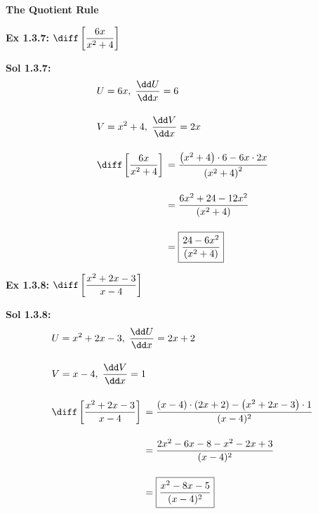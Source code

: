 \bigskip

\textbf{\large{The Quotient Rule}} \par

\begin{tcolorbox}[example]
    \textbf{Ex 1.3.7: } $\diff \left[\dfrac{6x}{x^2 + 4}\right]$
\end{tcolorbox}
\begin{tcolorbox}[solution]
    \textbf{Sol 1.3.7: } \begin{align*}
        & U = 6x, \; \dfrac{\dd U}{\dd x} = 6 \\[11pt]
        & V = x^2 + 4, \; \dfrac{\dd V}{\dd x} = 2x \\[11pt]
        & \diff \left[\dfrac{6x}{x^2 + 4}\right] \begin{aligned}[t]
            & = \dfrac{\left(x^2 + 4\right) \cdot 6 - 6x \cdot 2x}{\left(x^2 + 4\right)^2} \\[11pt]
            & = \dfrac{6x^2 + 24 - 12x^2}{\left(x^2 + 4\right)} \\[11pt]
            & = \boxed{\dfrac{24 - 6x^2}{\left(x^2 + 4\right)}}
        \end{aligned}
    \end{align*}
\end{tcolorbox} \vspace{11pt}    

\begin{tcolorbox}[example]
    \textbf{Ex 1.3.8: } $\diff \left[\dfrac{x^2 + 2x - 3}{x - 4}\right]$ 
\end{tcolorbox}
\begin{tcolorbox}[solution]
    \textbf{Sol 1.3.8: } \begin{align*}
        & U = x^2 + 2x - 3, \; \dfrac{\dd U}{\dd x} = 2x + 2 \\[11pt]
        & V = x - 4, \; \dfrac{\dd V}{\dd x} = 1 \\[11pt]
        & \diff \left[\dfrac{x^2 + 2x - 3}{x - 4}\right] \begin{aligned}[t]
            & = \dfrac{(x - 4) \cdot (2x + 2) - \left(x^2 + 2x - 3\right) \cdot 1}{(x - 4)^2} \\[11pt]
            & = \dfrac{2x^2 - 6x - 8 - x^2 - 2x + 3}{(x - 4)^2} \\[11pt]
            & = \boxed{\dfrac{x^2 - 8x - 5}{(x - 4)^2}}
        \end{aligned}
    \end{align*} 
\end{tcolorbox} \vspace{11pt}

